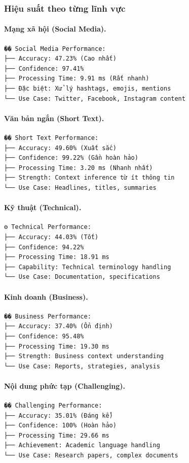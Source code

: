 \subsubsection{Hiệu suất theo từng lĩnh vực}

\paragraph{Mạng xã hội (Social Media).}
\begin{verbatim}
�� Social Media Performance:
├── Accuracy: 47.23% (Cao nhất)
├── Confidence: 97.41%
├── Processing Time: 9.91 ms (Rất nhanh)
├── Đặc biệt: Xử lý hashtags, emojis, mentions
└── Use Case: Twitter, Facebook, Instagram content
\end{verbatim}

\paragraph{Văn bản ngắn (Short Text).}
\begin{verbatim}
�� Short Text Performance:
├── Accuracy: 49.60% (Xuất sắc)
├── Confidence: 99.22% (Gần hoàn hảo)
├── Processing Time: 3.20 ms (Nhanh nhất)
├── Strength: Context inference từ ít thông tin
└── Use Case: Headlines, titles, summaries
\end{verbatim}

\paragraph{Kỹ thuật (Technical).}
\begin{verbatim}
⚙️ Technical Performance:
├── Accuracy: 44.03% (Tốt)
├── Confidence: 94.22%
├── Processing Time: 18.91 ms
├── Capability: Technical terminology handling
└── Use Case: Documentation, specifications
\end{verbatim}

\paragraph{Kinh doanh (Business).}
\begin{verbatim}
�� Business Performance:
├── Accuracy: 37.40% (Ổn định)
├── Confidence: 95.48%
├── Processing Time: 19.30 ms
├── Strength: Business context understanding
└── Use Case: Reports, strategies, analysis
\end{verbatim}

\paragraph{Nội dung phức tạp (Challenging).}
\begin{verbatim}
�� Challenging Performance:
├── Accuracy: 35.01% (Đáng kể)
├── Confidence: 100% (Hoàn hảo)
├── Processing Time: 29.66 ms
├── Achievement: Academic language handling
└── Use Case: Research papers, complex documents
\end{verbatim}

